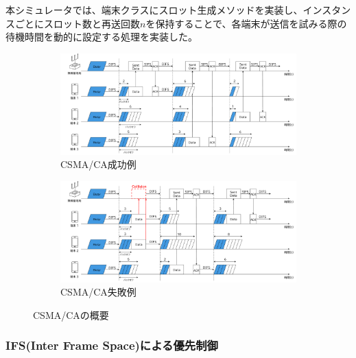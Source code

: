 \documentclass[a4paper, 10pt]{ltjsarticle}
\begin{document}
本シミュレータでは、端末クラスにスロット生成メソッドを実装し、インスタンスごとにスロット数と再送回数$n$を保持することで、各端末が送信を試みる際の待機時間を動的に設定する処理を実装した。





\begin{figure}[htbp]
  \centering

  \begin{subfigure}{\columnwidth}
    \centering
    \includegraphics[width=1\columnwidth]{./assets/csma-ca-s.png}
    \caption{CSMA/CA成功例}
    \label{1a}
  \end{subfigure}


  \begin{subfigure}{\columnwidth}
    \centering
    \includegraphics[width=1\columnwidth]{./assets/csma-ca-f.png}
    \caption{CSMA/CA失敗例}
    \label{1b}
  \end{subfigure}


  \caption{CSMA/CAの概要}
  \label{CSMA/CA}
\end{figure}

\subsubsection{IFS(Inter Frame Space)による優先制御}
\end{document}
